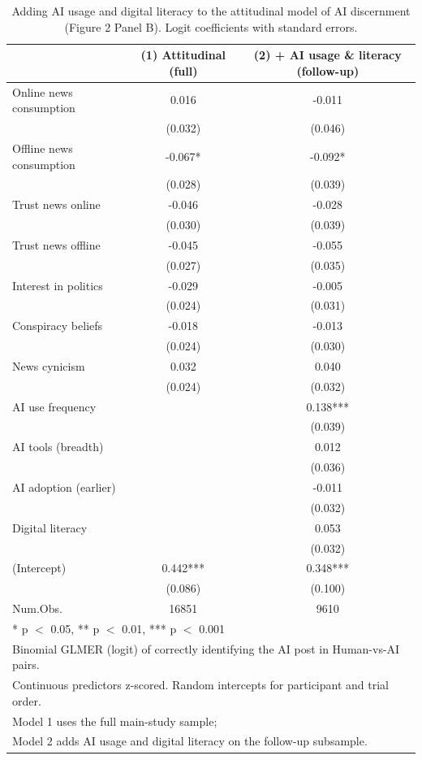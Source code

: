 \begin{table}
\centering
\caption{Adding AI usage and digital literacy to the attitudinal model of AI discernment (Figure 2 Panel B). Logit coefficients with standard errors.}
\centering
\begin{tabular}[t]{lcc}
\toprule
  & (1) Attitudinal (full) & (2) + AI usage \& literacy (follow-up)\\
\midrule
Online news consumption & 0.016 & -0.011\\
 & (0.032) & (0.046)\\
Offline news consumption & -0.067* & -0.092*\\
 & (0.028) & (0.039)\\
Trust news online & -0.046 & -0.028\\
 & (0.030) & (0.039)\\
Trust news offline & -0.045 & -0.055\\
 & (0.027) & (0.035)\\
Interest in politics & -0.029 & -0.005\\
 & (0.024) & (0.031)\\
Conspiracy beliefs & -0.018 & -0.013\\
 & (0.024) & (0.030)\\
News cynicism & 0.032 & 0.040\\
 & (0.024) & (0.032)\\
AI use frequency &  & 0.138***\\
 &  & (0.039)\\
AI tools (breadth) &  & 0.012\\
 &  & (0.036)\\
AI adoption (earlier) &  & -0.011\\
 &  & \vphantom{1} (0.032)\\
Digital literacy &  & 0.053\\
 &  & (0.032)\\
(Intercept) & 0.442*** & 0.348***\\
 & (0.086) & (0.100)\\
\midrule
Num.Obs. & 16851 & 9610\\
\bottomrule
\multicolumn{3}{l}{\rule{0pt}{1em}* p $<$ 0.05, ** p $<$ 0.01, *** p $<$ 0.001}\\
\multicolumn{3}{l}{\rule{0pt}{1em}Binomial GLMER (logit) of correctly identifying the AI post in Human-vs-AI pairs.}\\
\multicolumn{3}{l}{\rule{0pt}{1em}Continuous predictors z-scored. Random intercepts for participant and trial order.}\\
\multicolumn{3}{l}{\rule{0pt}{1em}Model 1 uses the full main-study sample;}\\
\multicolumn{3}{l}{\rule{0pt}{1em}Model 2 adds AI usage and digital literacy on the follow-up subsample.}\\
\end{tabular}
\end{table}
